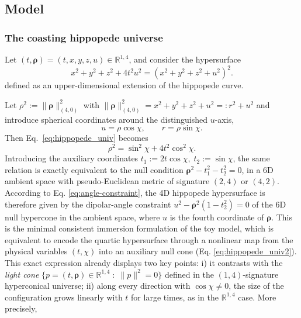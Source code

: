\documentclass[11pt]{article}
\renewcommand{\vec}[1]{\boldsymbol{#1}}
\begin{document}
\subsection{Model}

\subsubsection{The coasting hippopede universe}

Let $(t, \vec \rho) = (t,x,y,z,u)\in\mathbb{R}^{1,4}$, and consider the hypersurface
\begin{equation}
\label{eq:hippopede_univ}
 x^2 + y^2 + z^2 + 4t^2 u^2 = (x^2 + y^2 + z^2 + u^2)^2 .
\end{equation}
defined as an upper-dimensional extension of the hippopede curve.

 Let $\rho^2 := \|\vec \rho\|_{\scriptscriptstyle{(4,0)}}^2$ with $\|\vec \rho\|_{\scriptscriptstyle{(4,0)}}^2=x^2 + y^2+z^2 + u^2 =: r^2 + u^2$ and introduce spherical coordinates around the distinguished $u$-axis,
\begin{equation}\label{eq:angle-constraint}
u=\rho\cos\chi,\qquad r=\rho\sin\chi.
\end{equation}
Then Eq.~\eqref{eq:hippopede_univ} becomes
\begin{equation}
\label{eq:hippopede_univ2}
\rho^2=\sin^2\chi+4t^2\cos^2\chi.
\end{equation}
Introducing the auxiliary coordinates
$t_1:=2t\cos\chi,\; t_2:=\sin\chi$,
the same relation is exactly equivalent to the null condition $\vec{\rho}^2-t_1^2-t_2^2=0$,
in a 6D ambient space with pseudo-Euclidean metric of signature $(2,4)$ or $(4,2)$. According to Eq. \ref{eq:angle-constraint}, the 4D hippopede hypersurface is therefore given by the dipolar-angle constraint $u^2-{\vec \rho}^2(1-t_2^2) = 0$ of the 6D null hypercone in the ambient space, where $u$ is the fourth coordinate of $\vec \rho$. This is the minimal consistent immersion formulation of the toy model, which is equivalent to encode the quartic hypersurface through a nonlinear map from the physical variables $(t,\chi)$ into an auxiliary null cone (Eq. \ref{eq:hippopede_univ2}). This exact expression already displays two key points: i) it contrasts with the \textit{light cone} $\{p = (t,\vec{\rho}) \in \mathbb{R}^{1,4}\;:\; \|p\|^2 = 0\}$ defined in the $(1,4)$-signature hyperconical universe; ii) along every direction with $\cos\chi\neq0$, the size of the configuration grows linearly with $t$ for large times, as in the $\mathbb{R}^{1,4}$ case. More precisely,
\end{document}
